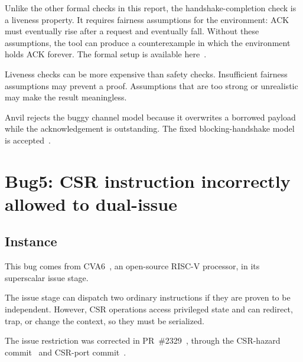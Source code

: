\documentclass[conference]{IEEEtran}
\newcommand{\bugsection}[2]{%
  \refstepcounter{section}%
  \setcounter{subsection}{0}%
  \section*{Bug#1: #2}%
}
\begin{document}
Unlike the other formal checks in this report, the handshake-completion check
is a liveness property. It requires fairness assumptions for the environment:
ACK must eventually rise after a request and eventually fall. Without these
assumptions, the tool can produce a counterexample in which the environment
holds ACK forever. The formal setup is available here~\cite{bug4-sby-checks}.

Liveness checks can be more expensive than safety checks. Insufficient fairness
assumptions may prevent a proof. Assumptions that are too strong or unrealistic
may make the result meaningless.

Anvil rejects the buggy channel model because it overwrites a borrowed payload
while the acknowledgement is outstanding. The fixed blocking-handshake model
is accepted~\cite{bug4-anvil-buggy,bug4-anvil-fixed,bug4-anvil-results}.












\bugsection{5}{CSR instruction incorrectly allowed to dual-issue}




\subsection{Instance}

This bug comes from CVA6~\cite{cva6}, an open-source RISC-V processor, in its
superscalar issue stage.

The issue stage can dispatch two ordinary instructions if they are proven to
be independent. However, CSR operations access privileged state and can
redirect, trap, or change the context, so they must be serialized.

The issue restriction was corrected in PR~\#2329~\cite{cva6-csr}, through the
CSR-hazard commit~\cite{cva6-csr-hazard-commit} and CSR-port
commit~\cite{cva6-csr-port-commit}.

\end{document}
